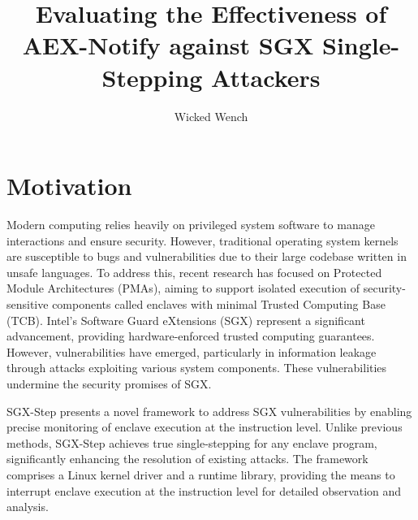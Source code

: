 \documentclass{llncs}
\title{Evaluating the Effectiveness of AEX-Notify against SGX Single-Stepping Attackers}
\author{Wicked Wench}
\institute{	University of L\"ubeck, Germany}
\begin{document}
\maketitle

%


\section{Motivation}


Modern computing relies heavily on privileged system software to manage
interactions and ensure security. However, traditional operating system kernels
are susceptible to bugs and vulnerabilities due to their large codebase written
in unsafe languages. To address this, recent research has focused on Protected
Module Architectures (PMAs), aiming to support isolated execution of
security-sensitive components called enclaves with minimal Trusted Computing
Base (TCB). Intel’s Software Guard eXtensions (SGX)
\cite{Intel16,Intel17} represent a significant advancement, providing
hardware-enforced trusted computing guarantees. However, vulnerabilities have
emerged, particularly in information leakage through attacks exploiting various
system components. These vulnerabilities undermine the security promises of
SGX.

SGX-Step presents a novel framework to address SGX vulnerabilities by enabling
precise monitoring of enclave execution at the instruction level. Unlike
previous methods, SGX-Step achieves true single-stepping for any enclave
program, significantly enhancing the resolution of existing attacks. The
framework comprises a Linux kernel driver and a runtime library, providing the
means to interrupt enclave execution at the instruction level for detailed
observation and analysis.
\end{document}
